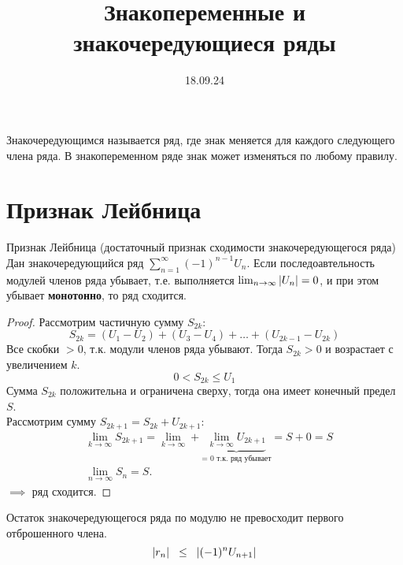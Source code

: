 

\title{Знакопеременные и знакочередующиеся ряды}
\date{18.09.24}


\maketitle
\begin{remark}
    Знакочередующимся называется ряд, где знак меняется 
    для каждого следующего члена ряда. В знакопеременном ряде 
    знак может изменяться по любому правилу.
\end{remark}

\section{Признак Лейбница}
\begin{thm}
    Признак Лейбница (достаточный признак сходимости знакочередующегося ряда)\\
    Дан знакочередующийся ряд \(\sum_{n=1}^{\infty} (-1)^{n-1} U_{n}\). 
    Если последоавтельность модулей членов ряда убывает, т.е. 
    выполняется \(\lim_{n\to\infty} \left|U_{n}\right|=0\), 
    и при этом убывает \textbf{монотонно}, то ряд сходится.
    \begin{proof}
        Рассмотрим частичную сумму \(S_{2k}\):
        \begin{equation}
            S_{2k} = (U_{1} - U_{2}) + (U_{3} - U_{4}) + 
            \dots + (U_{2k - 1} - U_{2k})
        \end{equation}
        Все скобки \(>0\), т.к. модули членов ряда убывают. 
        Тогда \(S_{2k} > 0\) и возрастает с увеличением \(k\).
        \begin{equation}
            0 < S_{2k} \leq U_{1}
        \end{equation}
        Сумма \(S_{2k}\) положительна и ограничена сверху, 
        тогда она имеет конечный предел \(S\). \\
        Рассмотрим сумму \(S_{2k+1} = S_{2k} + U_{2k+1}\):
        \begin{equation}
            \begin{align*}
                &\lim_{k\to\infty} S_{2k+1} = \lim_{k\to\infty} 
                + \underbrace{\lim_{k\to\infty}U_{2k+1}}_{\text{= 0 т.к. ряд убывает}} 
                = S+0= S\\
                &\lim_{n\to\infty}S_{n} = S.
            \end{align*}
        \end{equation}
        \(\implies\) ряд сходится.
    \end{proof}

    \begin{corollary}
        Остаток знакочередующегося ряда по модулю 
        не превосходит первого отброшенного члена.
        \begin{equation}
            |r_{n}| \hspace{0.2cm} \leq \hspace{0.2cm} |(-1)^{n}U_{n+1}|
        \end{equation}
    \end{corollary}
\end{thm}



